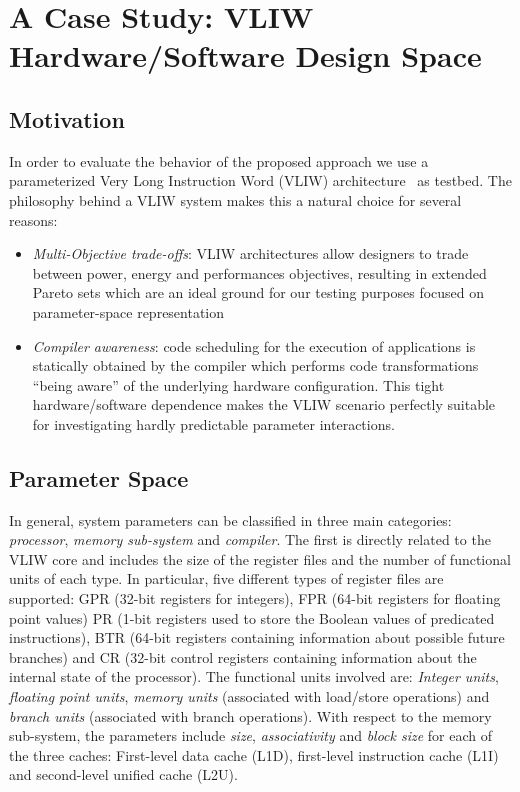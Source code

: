 \section{A Case Study: VLIW Hardware/Software Design Space}
\subsection{Motivation}
In order to evaluate the behavior of the proposed approach
we use a parameterized Very Long Instruction
Word (VLIW) architecture~\cite{kathail_tr00} as testbed. The philosophy
behind a VLIW system makes this a natural choice for several reasons:
\begin{itemize}
\item \emph{Multi-Objective trade-offs}: VLIW architectures allow designers
to trade between power, energy and performances objectives, resulting
in extended Pareto sets which are an ideal ground for our testing
purposes focused on parameter-space representation
\item \emph{Compiler awareness}: code scheduling for the execution of
applications is statically obtained by the compiler which
performs code transformations ``being aware'' of the underlying hardware
configuration.  This tight hardware/software dependence makes the
VLIW scenario perfectly suitable for investigating hardly predictable
parameter interactions.
\end{itemize}

\subsection{Parameter Space}
In general, system parameters can be classified in three main categories:
\emph{processor}, \emph{memory sub-system} and \emph{compiler}. 
The first is directly related to the VLIW core and includes the size
of the register files and the number of functional
units of each type. In particular, five different types of register
files are supported:
GPR (32-bit registers for integers), FPR (64-bit registers for
floating point values) PR (1-bit registers used to store the Boolean
values of predicated instructions), BTR (64-bit registers containing
information about possible future branches) and CR (32-bit control
registers containing information about the internal state of the
processor). The functional units involved are: \emph{Integer units},
\emph{floating point units}, \emph{memory units} (associated with
load/store operations) and \emph{branch units} (associated with branch
operations). With respect to the memory sub-system, the parameters
include \emph{size}, \emph{associativity} and
\emph{block size} for each of the three caches: First-level data cache
(L1D), first-level instruction cache (L1I) and second-level unified
cache (L2U).

